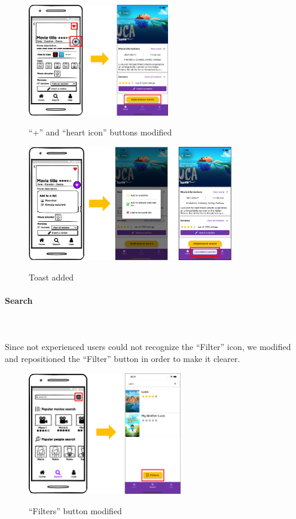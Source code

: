 \documentclass[12pt, a4paper]{article}
\numberwithin{figure}{section}
\begin{document}
\begin{figure}[H]
	\centering
	\includegraphics[width=0.55\textwidth]{images/prototype1/addBtn.png}\\
	\caption{“+” and “heart icon” buttons modified}
	\label{addBtn}
\end{figure}
\begin{figure}[H]
	\centering
	\includegraphics[width=0.8\textwidth]{images/prototype1/addToList.png}\\
	\caption{Toast added}
	\label{toastAddMovie}
\end{figure}

\paragraph{Search}\mbox{}\\\\
Since not experienced users could not recognize the “Filter” icon, we modified and repositioned the 
“Filter” button in order to make it clearer.\\

\begin{figure}[H]
	\centering
	\includegraphics[width=0.6\textwidth]{images/prototype1/filters.png}\\
	\caption{“Filters” button modified}
\end{figure}
\end{document}
